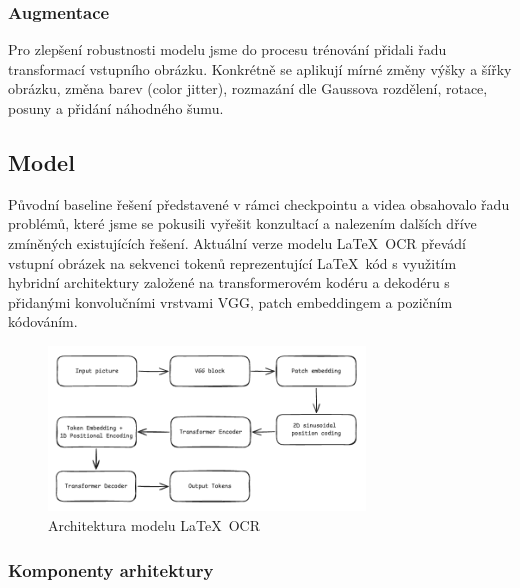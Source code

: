 \subsubsection{Augmentace}

Pro zlepšení robustnosti modelu jsme do procesu trénování přidali řadu transformací vstupního obrázku. Konkrétně se aplikují mírné změny výšky a šířky obrázku, změna barev (color jitter), rozmazání dle Gaussova rozdělení, rotace, posuny a přidání náhodného šumu.


\subsection{Model}

Původní baseline řešení představené v rámci checkpointu a videa obsahovalo řadu problémů, které jsme se pokusili vyřešit konzultací a nalezením dalších dříve zmíněných existujících řešení. Aktuální verze modelu \LaTeX~OCR převádí vstupní obrázek na sekvenci tokenů reprezentující \LaTeX~kód s využitím hybridní architektury založené na transformerovém kodéru a dekodéru s přidanými konvolučními vrstvami VGG, patch embeddingem a pozičním kódováním.

\begin{figure}[h!]
    \centering
    \includegraphics[width=0.75\textwidth]{img/model.png}
    \caption{Architektura modelu \LaTeX~OCR}
    \label{img:seq_sol}
\end{figure}

\subsubsection{Komponenty arhitektury}

